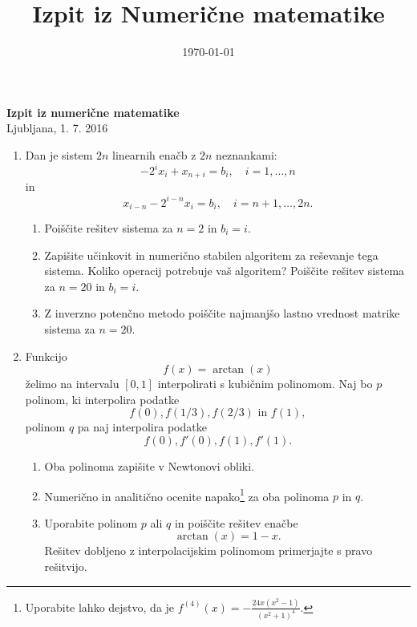 \documentclass[12pt]{article}
\date{\today}
\title{Izpit iz Numerične matematike}
\begin{document}
\begin{center}
\textbf{\huge{Izpit iz numerične matematike}}\\
\large{Ljubljana, 1. 7. 2016}
\end{center}
\bigskip

\begin{enumerate}
\item 
Dan je sistem \(2n\) linearnih enačb z \(2n\) neznankami: 
\[ -2^i x_{i} + x_{n+i} = b_i,\quad i=1,\ldots,n\]
in 
\[x_{i-n} - 2^{i-n} x_{i} = b_i,\quad i=n+1,\ldots,2n.\]
\begin{enumerate}
\item Poiščite rešitev sistema za \(n=2\) in \(b_i=i\).
\item Zapišite učinkovit in numerično stabilen algoritem za reševanje tega sistema.
Koliko operacij potrebuje vaš algoritem?
Poiščite rešitev sistema za \(n=20\) in \(b_i=i\).
\item Z inverzno potenčno metodo poiščite najmanjšo lastno vrednost matrike sistema
za \(n=20\).
\end{enumerate}

\item
Funkcijo 
\[f(x) = \arctan(x)\]
želimo na intervalu \([0,1]\) interpolirati s kubičnim polinomom. Naj bo \(p\)
polinom, ki interpolira podatke 
\[f(0), f(1/3), f(2/3)\text{ in }f(1),\] 
polinom \(q\) pa naj interpolira podatke
\[f(0), f'(0), f(1), f'(1).\]
\begin{enumerate}
\item Oba polinoma zapišite v Newtonovi obliki.
\item Numerično in analitično ocenite napako\footnote{Uporabite lahko dejstvo, da je \(f^(4)(x)=-\frac{24x(x^2-1)}{(x^2+1)^4}\).} za oba polinoma \(p\) in \(q\).
\item Uporabite polinom \(p\) ali \(q\) in poiščite rešitev enačbe
\[\arctan(x)=1-x.\]
Rešitev dobljeno z interpolacijskim polinomom primerjajte s pravo rešitvijo. 
\end{enumerate}
\end{enumerate}
\end{document}
